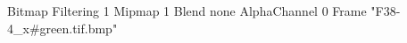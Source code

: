 {Bitmap
	{Filtering 1}
	{Mipmap 1}
	{Blend none}
	{AlphaChannel 0}
	{Frame "F38-4_x#green.tif.bmp"}
}
